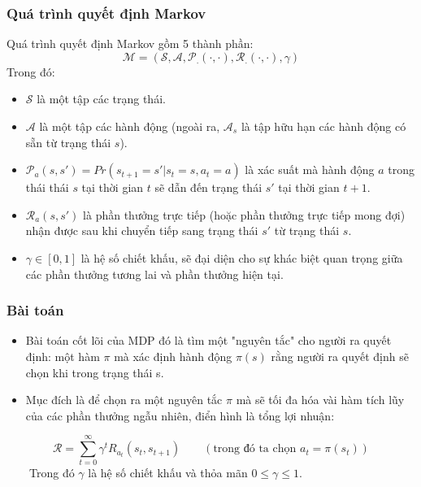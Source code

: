 \documentclass{beamer}
\begin{document}



\begin{frame}
\frametitle{Quá trình quyết định Markov}
Quá trình quyết định Markov gồm 5 thành phần:
$$\mathcal{M}=(\mathcal{S}, \mathcal{A}, \mathcal{P}_.(\cdotp,\cdotp),\mathcal{R}_.(\cdotp,\cdotp),\gamma)$$
Trong đó:
\begin{itemize}
\item $\mathcal{S}$ là một tập các trạng thái.
\item $\mathcal{A}$ là một tập các hành động (ngoài ra, $\mathcal{A}_s$ là tập hữu hạn các hành động có sẵn từ trạng thái $s$).
\item $\mathcal{P}_a(s,s')=Pr(s_{t+1}=s'|s_t=s,a_t=a)$ là xác suất mà hành động $a$ trong thái thái $s$ tại thời gian $t$ sẽ dẫn đến trạng thái $s'$ tại thời gian $t+1$.
\item $\mathcal{R}_a(s,s')$ là phần thưởng trực tiếp (hoặc phần thưởng trực tiếp mong đợi) nhận được sau khi chuyển tiếp sang trạng thái $s'$ từ trạng thái $s$.
\item $\gamma \in [0,1]$ là hệ số chiết khấu, sẽ đại diện cho sự khác biệt quan trọng giữa các phần thưởng tương lai và phần thưởng hiện tại.
\end{itemize}
\end{frame}

\begin{frame}
\frametitle{Bài toán}
\begin{itemize}
\item Bài toán cốt lõi của MDP đó là tìm một "nguyên tắc" cho người ra quyết định: một hàm $\pi$  mà xác định hành động $\displaystyle \pi (s)$ rằng người ra quyết định sẽ chọn khi trong trạng thái s.
\item Mục đích là để chọn ra một nguyên tắc $\pi$ mà sẽ tối đa hóa vài hàm tích lũy của các phần thưởng ngẫu nhiên, điển hình là tổng lợi nhuận:
\end{itemize}
$$\mathcal{R}=\sum_{t=0}^{\infty}{\gamma^{t}R_{a_t}(s_t,s_{t+1})} \qquad (\text{trong đó ta chọn } a_t=\pi (s_t))$$
$\qquad$Trong đó $\gamma$ là hệ số chiết khấu và thỏa mãn $0\leq \gamma \leq 1$.
\end{frame}
\end{document}
